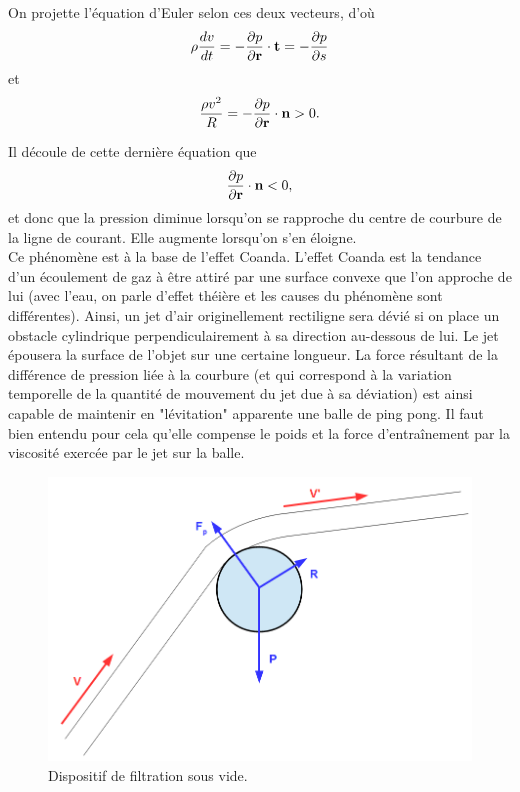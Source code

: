 \documentclass[11pt,a4paper]{report}
\begin{document}
On projette l'équation d'Euler selon ces deux vecteurs, d'où
\begin{equation}
	\rho \frac{dv}{dt} = -\frac{\partial p}{\partial \bold{r}}\cdot\bold{t} = - \frac{\partial p}{\partial s}
\end{equation}
et
\begin{equation}
	\frac{\rho v^2}{R} = -\frac{\partial p}{\partial \bold{r}}\cdot\bold{n} > 0.
\end{equation}
 
Il découle de cette dernière équation que
\begin{equation}
	\frac{\partial p}{\partial \bold{r}}\cdot\bold{n} < 0,
\end{equation}
et donc que la pression diminue lorsqu'on se rapproche du centre de courbure de la ligne de courant. Elle augmente lorsqu'on s'en éloigne.\\

Ce phénomène est à la base de l'effet Coanda. L'effet Coanda est la tendance d'un écoulement de gaz à être attiré par une surface convexe que l'on approche de lui (avec l'eau, on parle d'effet théière et les causes du phénomène sont différentes). Ainsi, un jet d'air originellement rectiligne sera dévié si on place un obstacle cylindrique perpendiculairement à sa direction au-dessous de lui. Le jet épousera la surface de l'objet sur une certaine longueur. La force résultant de la différence de pression liée à la courbure (et qui correspond à la variation temporelle de la quantité de mouvement du jet due à sa déviation) est ainsi capable de maintenir en "lévitation" apparente une balle de ping pong. Il faut bien entendu pour cela qu'elle compense le poids et la force d'entraînement par la viscosité exercée par le jet sur la balle.

	\begin{figure}[h!]
	\begin{center}
		\includegraphics[scale = 0.5]{coanda.png}
		\caption{Dispositif de filtration sous vide.} 
		\label{fig:coanda.png}
	\end{center}
	\end{figure}
\end{document}
